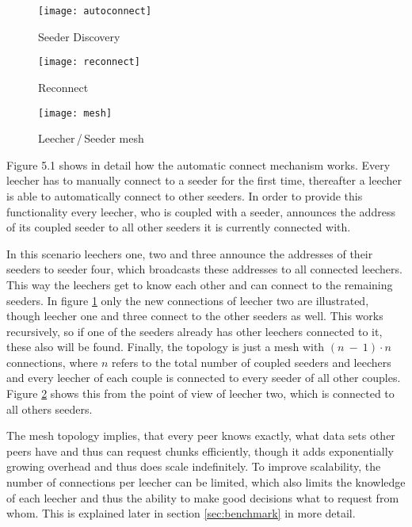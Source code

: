 \begin{figure}[ht]
	\centering
	\texttt{[image: autoconnect]}
	\caption{Seeder Discovery}
	\label{fig:autoconnect}
\end{figure}

\begin{figure} [ht]
	\centering
	\begin{minipage}[b]{0.6\linewidth}
		\texttt{[image: reconnect]}
		\caption{Reconnect}
		\label{fig:reconnect}
	\end{minipage}
	\hspace{0.1\linewidth}
	\begin{minipage}[b]{0.25\linewidth}
		\texttt{[image: mesh]}
		\caption{Leecher\,/\,Seeder mesh}
		\label{fig:mesh}
	\end{minipage}
\end{figure}

Figure 5.1 shows in detail how the automatic connect mechanism works. Every leecher has to manually connect to a seeder for the first time, thereafter a leecher is able to automatically connect to other seeders. In order to provide this functionality every leecher, who is coupled with a seeder, announces the address of its coupled seeder to all other seeders it is currently connected with.

In this scenario leechers one, two and three announce the addresses of their seeders to seeder four, which broadcasts these addresses to all connected leechers. This way the leechers get to know each other and can connect to the remaining seeders. In figure \ref{fig:autoconnect} only the new connections of leecher two are illustrated, though leecher one and three connect to the other seeders as well. This works recursively, so if one of the seeders already has other leechers connected to it, these also will be found. Finally, the topology is just a mesh with $(n\:-\:1)\cdot n$ connections, where $n$ refers to the total number of coupled seeders and leechers and every leecher of each couple is connected to every seeder of all other couples. Figure \ref{fig:mesh} shows this from the point of view of leecher two, which is connected to all others seeders.

The mesh topology implies, that every peer knows exactly, what data sets other peers have and thus can request chunks efficiently, though it adds exponentially growing overhead and thus does scale indefinitely. To improve scalability, the number of connections per leecher can be limited, which also limits the knowledge of each leecher and thus the ability to make good decisions what to request from whom. This is explained later in section \ref{sec:benchmark} in more detail.

